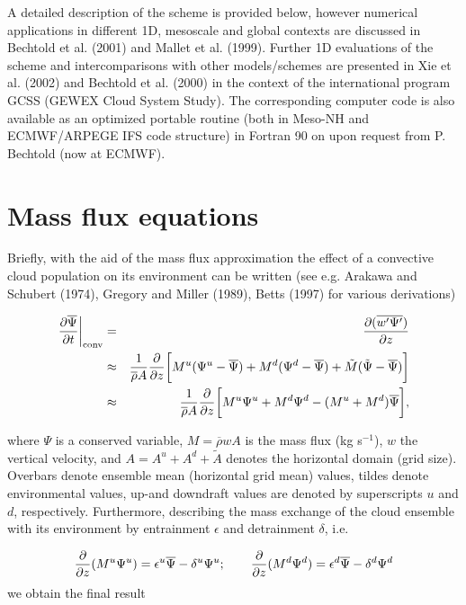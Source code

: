 A detailed description of the scheme is provided below, however
 numerical applications  in different 1D, mesoscale and global contexts
are discussed in Bechtold et al. (2001) and Mallet et al. (1999).
Further 1D evaluations of the scheme
and intercomparisons with other models/schemes are presented in
Xie et al. (2002) and Bechtold et al. (2000) in the context of the international program
GCSS (GEWEX Cloud System Study).
The corresponding computer code is also available as an optimized
portable routine (both in Meso-NH and ECMWF/ARPEGE IFS code structure) in Fortran 90 on
upon request from P. Bechtold (now at ECMWF).

\section{Mass flux equations}

Briefly, with the aid of the mass flux approximation
the effect of a
convective cloud population on its environment can be written
(see e.g. Arakawa and Schubert (1974),
Gregory and Miller (1989), Betts (1997) for various derivations)

\begin{eqnarray}
{\partial\overline{\Psi}\over\partial t}\bigg\vert_{\rm conv}&=&
{\partial (\overline{ w^\prime\Psi^\prime})\over\partial z}\\
&\approx&
{1\over\overline{\rho} A } {\partial\over\partial z}
\bigg[  M^u (\Psi^u-\overline{\Psi}) + M^d (\Psi^d-\overline{\Psi})
+ \tilde M (\tilde\Psi -\overline{\Psi})\bigg]\nonumber \\
&\approx&
{1\over\overline{\rho} A } {\partial\over\partial z}
\bigg[
 M^u\Psi^u+ M^d\Psi^d-( M^u+ M^d)\overline{\Psi}
\bigg],
\label{eqc3}
\end{eqnarray}

\noindent
where $\Psi$ is a conserved variable, $M=\overline{\rho} w A$ is
the mass flux (kg s$^{-1}$), $w$ the vertical velocity, and
$A=A^u+A^d+\tilde A$  denotes the horizontal domain (grid size).
Overbars denote ensemble mean (horizontal grid mean) values, tildes
denote environmental values, up-and downdraft values are denoted
by superscripts $u$ and $d$, respectively. Furthermore,
describing the mass exchange of the cloud ensemble with its environment by
entrainment $\epsilon$ and detrainment $\delta$, i.e.

\begin{equation}
{\partial\over\partial z}  (M^u\Psi^u)=
\epsilon^u\overline{\Psi}-\delta^u\Psi^u;\quad\quad
{\partial\over\partial z}  (M^d\Psi^d)=
\epsilon^d\overline{\Psi}-\delta^d\Psi^d
\end{equation}
\noindent
we obtain the final result

